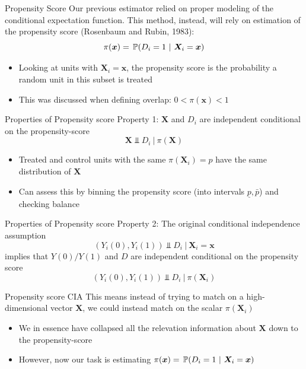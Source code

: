 \documentclass[aspectratio=169,t,11pt,table]{beamer}
\begin{document}
\begin{frame}{Propensity Score}
  Our previous estimator relied on proper modeling of the conditional expectation function. This method, instead, will rely on estimation of the \alert{propensity score} (Rosenbaum and Rubin, 1983):
  $$
    \pi(\bm{x}) = \prob{D_i = 1}{\bm{X}_i = \bm{x}}
  $$
  \begin{itemize}
    \item Looking at units with $\bm{X}_i = \bm{x}$, the propensity score is the probability a random unit in this subset is treated
    \item This was discussed when defining \alert{overlap}: $0 < \pi(\bm{x}) < 1$
  \end{itemize}
\end{frame}

\begin{frame}{Properties of Propensity score}
  Property 1: $\bm{X}$ and $D_i$ are independent conditional on the propensity-score 
  $$
    \bm{X} \Perp D_i \ \vert \ \pi(\bm{X})
  $$
  \begin{itemize}
    \item Treated and control units with the same $\pi(\bm{X}_i) = p$ have the same distribution of $\bm{X}$ 
    \item Can assess this by binning the propensity score (into intervals $\underline{p}, \bar{p}$) and checking balance 
  \end{itemize}
\end{frame}

\begin{frame}{Properties of Propensity score}
  Property 2: The original conditional independence assumption
  $$
    (Y_{i}(0), Y_{i}(1)) \Perp D_i \ \vert \ \bm{X}_i = \bm{x}
  $$
  implies that $Y(0)/Y(1)$ and $D$ are independent conditional on the propensity score
  $$
    (Y_{i}(0), Y_{i}(1)) \Perp D_i \ \vert \ \pi(\bm{X}_i)
  $$
\end{frame}

\begin{frame}{Propensity score CIA}
  This means instead of trying to match on a high-dimensional vector $\bm{X}$, we could instead match on the scalar $\pi(\bm{X}_i)$
  \begin{itemize}
    \item We in essence have collapsed all the relevation information about $\bm{X}$ down to the propensity-score
    
    \item However, now our task is estimating $\pi(\bm{x}) = \prob{D_i = 1}{\bm{X}_i = \bm{x}}$
  \end{itemize}
\end{frame}
\end{document}
